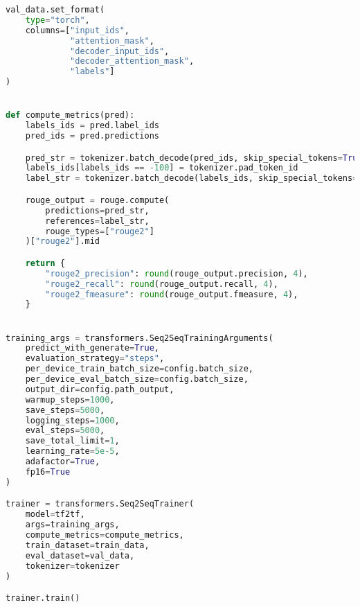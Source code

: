 \begin{lstlisting}[language=Python, caption=Trainingscode]
val_data.set_format(
    type="torch",
    columns=["input_ids",
             "attention_mask",
             "decoder_input_ids",
             "decoder_attention_mask",
             "labels"]
)


def compute_metrics(pred):
    labels_ids = pred.label_ids
    pred_ids = pred.predictions

    pred_str = tokenizer.batch_decode(pred_ids, skip_special_tokens=True)
    labels_ids[labels_ids == -100] = tokenizer.pad_token_id
    label_str = tokenizer.batch_decode(labels_ids, skip_special_tokens=True)

    rouge_output = rouge.compute(
        predictions=pred_str,
        references=label_str,
        rouge_types=["rouge2"]
    )["rouge2"].mid

    return {
        "rouge2_precision": round(rouge_output.precision, 4),
        "rouge2_recall": round(rouge_output.recall, 4),
        "rouge2_fmeasure": round(rouge_output.fmeasure, 4),
    }


training_args = transformers.Seq2SeqTrainingArguments(
    predict_with_generate=True,
    evaluation_strategy="steps",
    per_device_train_batch_size=config.batch_size,
    per_device_eval_batch_size=config.batch_size,
    output_dir=config.path_output,
    warmup_steps=1000,
    save_steps=5000,
    logging_steps=1000,
    eval_steps=5000,
    save_total_limit=1,
    learning_rate=5e-5,
    adafactor=True,
    fp16=True
)

trainer = transformers.Seq2SeqTrainer(
    model=tf2tf,
    args=training_args,
    compute_metrics=compute_metrics,
    train_dataset=train_data,
    eval_dataset=val_data,
    tokenizer=tokenizer
)

trainer.train()
\end{lstlisting}
\newpage

